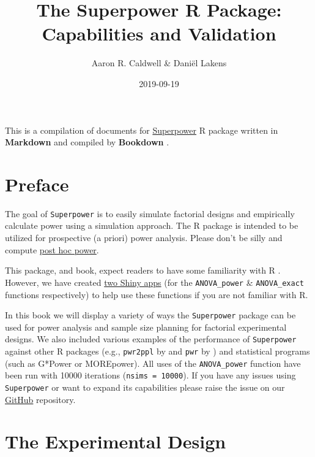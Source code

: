 \documentclass[]{book}
\title{The Superpower R Package: Capabilities and Validation}
\author{Aaron R. Caldwell \& Daniël Lakens}
\date{2019-09-19}
\begin{document}
\maketitle

{
\setcounter{tocdepth}{1}
\tableofcontents
}
This is a compilation of documents for \href{https://github.com/arcaldwell49/Superpower}{Superpower} R package written in \textbf{Markdown} \citep{R-rmarkdown} and compiled by \textbf{Bookdown} \citep{R-bookdown}.

\hypertarget{preface}{%
\chapter*{Preface}\label{preface}}

The goal of \texttt{Superpower} is to easily simulate factorial designs and empirically calculate power using a simulation approach.
The R package is intended to be utilized for prospective (a priori) power analysis. Please don't be silly and compute \href{https://discourse.datamethods.org/t/reference-collection-to-push-back-against-common-statistical-myths/1787}{post hoc power}.

This package, and book, expect readers to have some familiarity with R \citep{R-base}. However, we have created \href{http://shiny.ieis.tue.nl/anova_power/}{two Shiny apps} (for the \texttt{ANOVA\_power} \& \texttt{ANOVA\_exact} functions respectively) to help use these functions if you are not familiar with R.

In this book we will display a variety of ways the \texttt{Superpower} package can be used for power analysis and sample size planning for factorial experimental designs. We also included various examples of the performance of \texttt{Superpower} against other R packages (e.g., \texttt{pwr2ppl} by \citet{R-pwr2ppl} and \texttt{pwr} by \citet{R-pwr}) and statistical programs (such as G*Power or MOREpower). All uses of the \texttt{ANOVA\_power} function have been run with 10000 iterations (\texttt{nsims\ =\ 10000}). If you have any issues using \texttt{Superpower} or want to expand its capabilities please raise the issue on our \href{https://github.com/arcaldwell49/Superpower/issues}{GitHub} repository.

\hypertarget{the-experimental-design}{%
\chapter{The Experimental Design}\label{the-experimental-design}}
\end{document}
